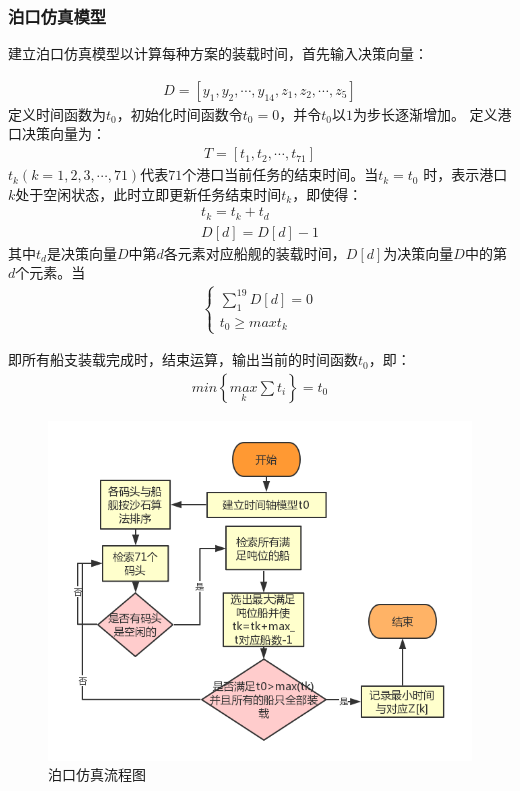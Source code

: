 \documentclass{whutmod}
\begin{document}
	\subsubsection{泊口仿真模型}
	建立泊口仿真模型以计算每种方案的装载时间，首先输入决策向量：

		\begin{gather*}
	 D=[y_{1},y_{2},\cdots,y_{14},z_{1},z_{2},\cdots,z_{5}]
		\end{gather*}
	定义时间函数为$t_{0}$，初始化时间函数令$t_{0}=0$，并令$t_{0}$以$1$为步长逐渐增加。
	定义港口决策向量为：
		\begin{gather*}
		T=[t_{1},t_{2},\cdots,t_{71}]
		\end{gather*}
	$t_{k}(k=1,2,3,\cdots,71)$代表$71$个港口当前任务的结束时间。当$t_{k}=t_{0}$ 时，表示港口$k$处于空闲状态，此时立即更新任务结束时间$t_{k}$，即使得：
		\begin{gather*}
		t_{k}=t_{k}+t_{d}\\
		D[d]=D[d]-1
		\end{gather*}
	其中$t_{d}$是决策向量$D$中第$d$各元素对应船舰的装载时间，$D[d]$为决策向量$D$中的第$d$个元素。当
		\begin{gather*}
	\left\{\begin{matrix} \sum_{1}^{19}D[d]=0
	\\t_{0}\geqslant max t_{k} 	
	\end{matrix}\right.
		\end{gather*}

		即所有船支装载完成时，结束运算，输出当前的时间函数$t_{0}$，即：
			\begin{gather*}
		min \left \{ \underset{k}{max}\sum t_{i} \right \}=t_{0}
			\end{gather*}
    \begin{figure}[H]
	\centering
	\includegraphics[width=.9\textwidth]{figures/yyy.png}
	\caption{泊口仿真流程图}\label{dieyyrwen}
\end{figure}
\end{document}

